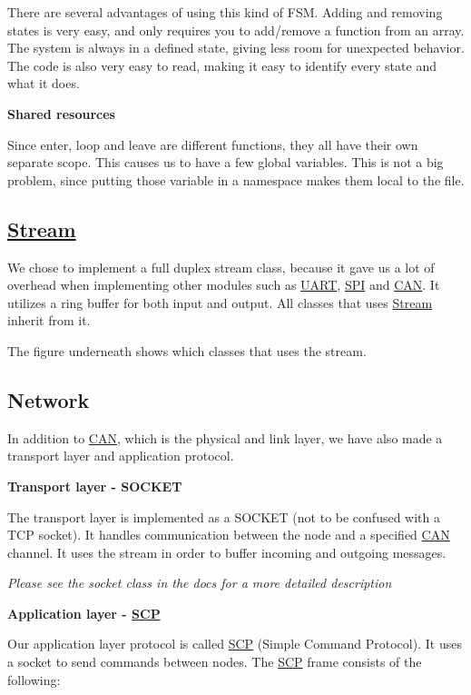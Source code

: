 There are several advantages of using this kind of F\+SM. Adding and removing states is very easy, and only requires you to add/remove a function from an array. The system is always in a defined state, giving less room for unexpected behavior. The code is also very easy to read, making it easy to identify every state and what it does.

{\bfseries Shared resources}

Since enter, loop and leave are different functions, they all have their own separate scope. This causes us to have a few global variables. This is not a big problem, since putting those variable in a namespace makes them local to the file.

\subsection*{\hyperlink{class_stream}{Stream}}

We chose to implement a full duplex stream class, because it gave us a lot of overhead when implementing other modules such as \hyperlink{class_u_a_r_t}{U\+A\+RT}, \hyperlink{namespace_s_p_i}{S\+PI} and \hyperlink{class_c_a_n}{C\+AN}. It utilizes a ring buffer for both input and output. All classes that uses \hyperlink{class_stream}{Stream} inherit from it.

The figure underneath shows which classes that uses the stream.



\subsection*{Network}

In addition to \hyperlink{class_c_a_n}{C\+AN}, which is the physical and link layer, we have also made a transport layer and application protocol.

{\bfseries Transport layer -\/ S\+O\+C\+K\+ET}

The transport layer is implemented as a S\+O\+C\+K\+ET (not to be confused with a T\+CP socket). It handles communication between the node and a specified \hyperlink{class_c_a_n}{C\+AN} channel. It uses the stream in order to buffer incoming and outgoing messages.

{\itshape Please see the socket class in the docs for a more detailed description}

{\bfseries Application layer -\/ \hyperlink{class_s_c_p}{S\+CP}}

Our application layer protocol is called \hyperlink{class_s_c_p}{S\+CP} (Simple Command Protocol). It uses a socket to send commands between nodes. The \hyperlink{class_s_c_p}{S\+CP} frame consists of the following\+:



